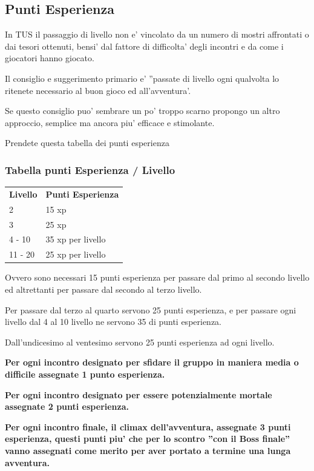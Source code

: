 \documentclass[a4paper,11pt,twoside,openany]{book}
\begin{document}
\subsection{Punti Esperienza}

\label{punti-esperienza}

In TUS il passaggio di livello non e' vincolato da un numero di mostri affrontati o dai tesori ottenuti, bensi' dal fattore di difficolta' degli incontri e da come i giocatori hanno giocato.

Il consiglio e suggerimento primario e' ''passate di livello ogni qualvolta lo ritenete necessario al buon gioco ed all'avventura'.

Se questo consiglio puo' sembrare un po' troppo scarno propongo un altro approccio, semplice ma ancora piu' efficace e stimolante.

Prendete questa tabella dei punti esperienza

\subsubsection{Tabella punti Esperienza / Livello}

\label{tabella-punti-esperienza-livello}

\begin{tabular}{ll}
\toprule
\textbf{Livello} & \textbf{Punti Esperienza}\tabularnewline
2 & 15 xp\tabularnewline
3 & 25 xp\tabularnewline
4 - 10 & 35 xp per livello\tabularnewline
11 - 20 & 25 xp per livello\tabularnewline
\end{tabular}

\bigskip

Ovvero sono necessari 15 punti esperienza per passare dal primo al secondo livello ed altrettanti per passare dal secondo al terzo livello.

Per passare dal terzo al quarto servono 25 punti esperienza, e per passare ogni livello dal 4 al 10 livello ne servono 35 di punti esperienza.

Dall'undicesimo al ventesimo servono 25 punti esperienza ad ogni livello.

\textbf{Per ogni incontro designato per sfidare il gruppo in maniera media o difficile assegnate 1 punto esperienza.}

\textbf{Per ogni incontro designato per essere potenzialmente mortale assegnate 2 punti esperienza.}

\textbf{Per ogni incontro finale, il climax dell'avventura, assegnate 3 punti esperienza, questi punti piu' che per lo scontro ''con il Boss finale'' vanno assegnati come merito per aver portato a termine una lunga avventura.}
\end{document}
